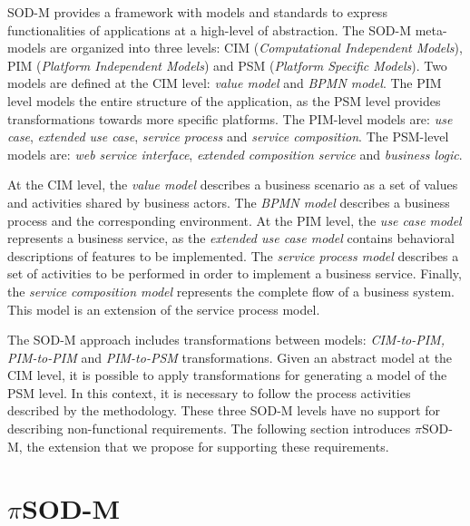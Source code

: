 \documentclass{llncs}
\theoremstyle{plain}
\theoremstyle{plain}
\theoremstyle{plain}
\begin{document}
SOD-M provides a framework with models and standards to express functionalities
of applications at a high-level of abstraction. The SOD-M meta-models are organized 
into three levels: CIM (\textit{Computational Independent Models}), 
PIM (\textit{Platform Independent Models}) and PSM (\textit{Platform Specific Models}).
Two models are defined at the CIM level: \textit{value model} 
and \textit{BPMN model}. 
The PIM level models the entire structure of the application, as
the PSM level provides transformations towards more specific platforms.
The PIM-level models are: \textit{use case}, \textit{extended use case}, \textit{service process} and
\textit{service composition}. The PSM-level models are: \textit{web service interface}, \textit{extended composition service} and \textit{business logic}. 
 
At the CIM level, the \textit{value model} describes a business
scenario as a set of values and activities shared by business actors. 
The \textit{BPMN model} describes a business process and the corresponding environment. 
At the PIM level, the \textit{use case model} represents
a business service, as the \textit{extended use case model} contains 
behavioral descriptions of features to be implemented. 
The \textit{service process model} describes a set of
activities to be performed in order to implement a business service.
Finally, the \textit{service composition model} represents the complete flow of a business system. 
This model is an extension of the service process model. 

The SOD-M approach includes transformations between models:
\textit{CIM-to-PIM, PIM-to-PIM} and \textit{PIM-to-PSM} transformations. Given
an abstract model at the CIM level, it is possible to apply transformations for
generating a model of the PSM level. In this context, it is necessary to
follow the process activities described by the methodology. 
%
These three SOD-M levels have no support for describing non-functional requirements. The following section introduces $\pi$SOD-M, the extension that we propose for supporting these requirements.







\section{$\pi$SOD-M}\label{sec:pisodm}
%
\end{document}
